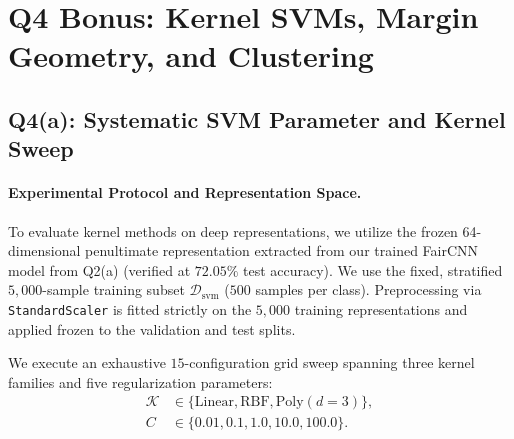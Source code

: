\section{Q4 Bonus: Kernel SVMs, Margin Geometry, and Clustering}
\label{sec:q4}

\subsection{Q4(a): Systematic SVM Parameter and Kernel Sweep}
\paragraph{Experimental Protocol and Representation Space.}
To evaluate kernel methods on deep representations, we utilize the frozen 64-dimensional penultimate representation extracted from our trained FairCNN model from Q2(a) (verified at $\mathbf{72.05\%}$ test accuracy). We use the fixed, stratified $5{,}000$-sample training subset $\mathcal{D}_{\text{svm}}$ ($500$ samples per class). Preprocessing via \texttt{StandardScaler} is fitted strictly on the $5{,}000$ training representations and applied frozen to the validation and test splits.

We execute an exhaustive $15$-configuration grid sweep spanning three kernel families and five regularization parameters:
\begin{equation}
\begin{aligned}
    \mathcal{K} &\in \{\text{Linear}, \text{RBF}, \text{Poly} (d=3)\}, \\
    C &\in \{0.01, 0.1, 1.0, 10.0, 100.0\}.
\end{aligned}
\end{equation}

